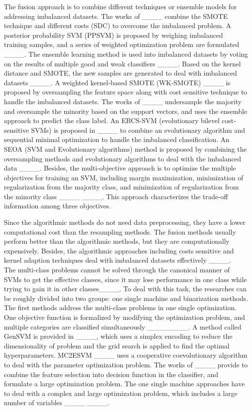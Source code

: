 The fusion approach is to combine different techniques or ensemble models for addressing imbalanced datasets. The works of ____ combine the SMOTE technique and different costs (SDC) to overcome the imbalanced problem. A posterior probability SVM (PPSVM) is proposed by weighing imbalanced training samples, and a series of weighted optimization problem are formulated ____. The ensemble learning method is used into imbalanced datasets by voting on the results of multiple good and weak classifiers ____. Based on the kernel distance and SMOTE, the new samples are generated to deal with imbalanced datasets ____. A weighted kernel-based SMOTE (WK-SMOTE) ____ is proposed by oversampling the feature space along with cost sensitive technique to handle the imbalanced datasets. The works of ____ undersample the majority and oversample the minority based on the support vectors, and uses the ensemble approach to predict the class label. An EBCS-SVM (evolutionary bilevel cost-sensitive SVMs) is proposed in ____ to combine an evolutionary algorithm and sequential minimal optimization to handle the imbalanced classification. An SEOA (SVM and Evolutionary algorithms) method is proposed by combining the oversampling methods and evolutionary algorithms to deal with the imbalanced data ____. Besides, the multi-objective approach is to optimize the multiple objectives for training an SVM, including margin maximization, minimization of regularization from the majority class, and minimization of regularization from the minority class ____ ____. This approach characterizes the trade-off information among three objectives. 

Since the algorithmic methods do not need data preprocessing, they have a lower computational cost than the resampling methods. The fusion methods usually perform better than the algorithmic methods, but they are computationally expensively. Besides, the algorithmic approaches including costs sensitive and kernel adaption techniques deal with imbalanced datasets effectively ____.
~\\

The multi-class problems cannot be solved through the canonical manner of SVMs to get the effective classes, since it may lose performance in one class while trying to gain it in other classes____. To deal with this task, the researches can be roughly divided into two groups: one single machine and binarization methods. The first methods address the multi-class problems in one single optimization. One objective function is formalized by modifying the optimization problem, and multiple categories are classified simultaneously ________. A method called GenSVM is provided in ____, which uses a simplex encoding to reduce the dimensionality of problem and the grid search is applied to find the optimal hyperparameters. MC2ESVM ____ uses a cooperative coevolutionary algorithm to deal with the parameter optimization problem. The works of ____ provide to combine the feature selection into decision function in the classifier, and formulate a large optimization problem. The one single machine approaches have to deal with a complex and large optimization problem, which includes a large number of variables ____ ____.

